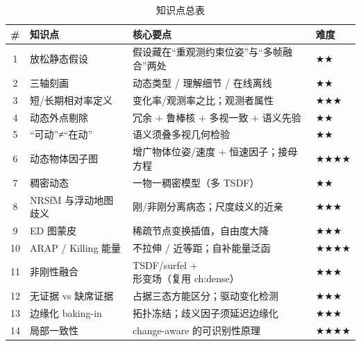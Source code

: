 \begin{table}[H]\centering\small
\caption{知识点总表}
\begin{tabular}{clll}
\toprule
\# & 知识点 & 核心要点 & 难度 \\
\midrule
1 & 放松静态假设 & 假设藏在“重观测约束位姿”与“多帧融合”两处 & $\bigstar\bigstar$ \\
2 & 三轴刻画 & 动态类型 / 理解细节 / 在线离线 & $\bigstar\bigstar$ \\
3 & 短/长期相对率定义 & 变化率/观测率之比；观测者属性 & $\bigstar\bigstar\bigstar$ \\
4 & 动态外点剔除 & 冗余 $+$ 鲁棒核 $+$ 多视一致 $+$ 语义先验 & $\bigstar\bigstar$ \\
5 & “可动”≠“在动” & 语义须叠多视几何检验 & $\bigstar\bigstar$ \\
6 & 动态物体因子图 & 增广物体位姿/速度 $+$ 恒速因子；接母方程 & $\bigstar\bigstar\bigstar\bigstar$ \\
7 & 稠密动态 & 一物一稠密模型（多 TSDF）& $\bigstar\bigstar$ \\
8 & NRSfM 与浮动地图歧义 & 刚/非刚分离病态；尺度歧义的近亲 & $\bigstar\bigstar\bigstar$ \\
9 & ED 图蒙皮 & 稀疏节点变换插值，自由度大降 & $\bigstar\bigstar\bigstar$ \\
10 & ARAP / Killing 能量 & 不拉伸 / 近等距；自补能量泛函 & $\bigstar\bigstar\bigstar\bigstar$ \\
11 & 非刚性融合 & TSDF/surfel $+$ 形变场（复用 ch:dense）& $\bigstar\bigstar\bigstar$ \\
12 & 无证据 vs 缺席证据 & 占据三态方能区分；驱动变化检测 & $\bigstar\bigstar\bigstar$ \\
13 & 边缘化 baking-in & 拓扑冻结；歧义因子须延迟边缘化 & $\bigstar\bigstar\bigstar$ \\
14 & 局部一致性 & change-aware 的可识别性原理 & $\bigstar\bigstar\bigstar\bigstar$ \\
\bottomrule
\end{tabular}
\end{table}

